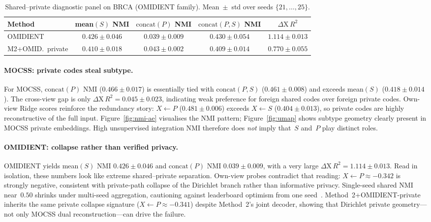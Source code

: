 \begin{table}[htbp]
\centering
\caption{Shared--private diagnostic panel on BRCA (OMIDIENT family). Mean~$\pm$~std over seeds $\{21,\ldots,25\}$.}
\label{tab:shared-private-omid}
\begin{tabular}{lcccc}
\hline
Method & mean$(S)$ NMI & $\mathrm{concat}(P)$ NMI & $\mathrm{concat}(P,S)$ NMI & $\Delta\mathrm{X}\,R^{2}$ \\
\hline
OMIDIENT & $0.426\pm0.046$ & $0.039\pm0.009$ & $0.430\pm0.054$ & $1.114\pm0.013$ \\
M2+OMID.\ private & $0.410\pm0.018$ & $0.043\pm0.002$ & $0.409\pm0.014$ & $0.770\pm0.055$ \\
\hline
\end{tabular}
\end{table}

\paragraph{MOCSS: private codes steal subtype.}
For MOCSS, $\mathrm{concat}(P)$ NMI ($0.466\pm0.017$) is essentially tied with $\mathrm{concat}(P,S)$ ($0.461\pm0.008$) and exceeds mean$(S)$ ($0.418\pm0.014$). The cross-view gap is only $\Delta\mathrm{X}\,R^{2}=0.045\pm0.023$, indicating weak preference for foreign shared codes over foreign private codes. Own-view Ridge scores reinforce the redundancy story: $X\leftarrow P$ ($0.481\pm0.006$) exceeds $X\leftarrow S$ ($0.404\pm0.013$), so private codes are highly reconstructive of the full input. Figure~\ref{fig:nmi-ae} visualises the NMI pattern; Figure~\ref{fig:umap} shows subtype geometry clearly present in MOCSS private embeddings. High unsupervised integration NMI therefore does \emph{not} imply that~$S$ and~$P$ play distinct roles.

\paragraph{OMIDIENT: collapse rather than verified privacy.}
OMIDIENT yields mean$(S)$ NMI $0.426\pm0.046$ and $\mathrm{concat}(P)$ NMI $0.039\pm0.009$, with a very large $\Delta\mathrm{X}\,R^{2}=1.114\pm0.013$. Read in isolation, these numbers look like extreme shared--private separation. Own-view probes contradict that reading: $X\leftarrow P\approx-0.342$ is strongly negative, consistent with private-path collapse of the Dirichlet branch rather than informative privacy. Single-seed shared NMI near~$0.50$ shrinks under multi-seed aggregation, cautioning against leaderboard optimism from one seed~\citep{baiao2025technical}. Method~2+OMIDIENT-private inherits the same private collapse signature ($X\leftarrow P\approx-0.341$) despite Method~2's joint decoder, showing that Dirichlet private geometry---not only MOCSS dual reconstruction---can drive the failure.

